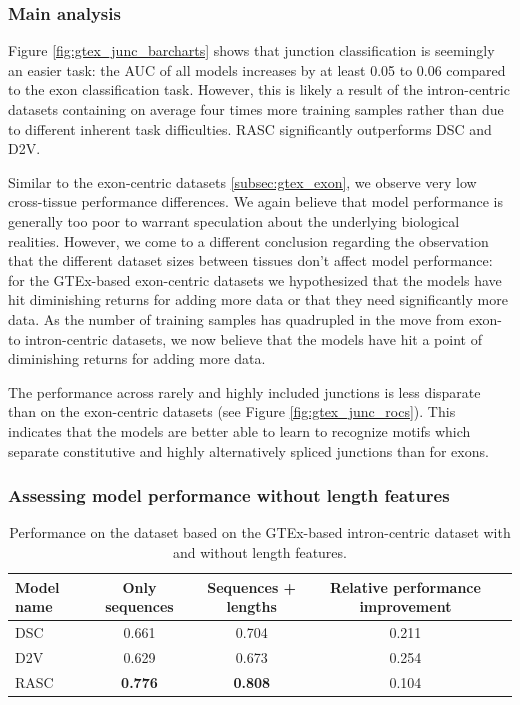 \subsubsection{Main analysis}
Figure \ref{fig:gtex_junc_barcharts} shows that junction classification is seemingly an easier task: the AUC of all models increases by at least 0.05 to 0.06 compared to the exon classification task. However, this is likely a result of the intron-centric datasets containing on average four times more training samples rather than due to different inherent task difficulties. RASC significantly outperforms DSC and D2V. 

Similar to the exon-centric datasets \ref{subsec:gtex_exon}, we observe very low cross-tissue performance differences. We again believe that model performance is generally too poor to warrant speculation about the underlying biological realities. However, we come to a different conclusion regarding the observation that the different dataset sizes between tissues don't affect model performance:
for the GTEx-based exon-centric datasets we hypothesized that the models have hit diminishing returns for adding more data or that they need significantly more data. As the number of training samples has quadrupled in the move from exon- to intron-centric datasets, we now believe that the models have hit a point of diminishing returns for adding more data. 




The performance across rarely and highly included junctions is less disparate than on the exon-centric datasets (see Figure \ref{fig:gtex_junc_rocs}). This indicates that the models are better able to learn to recognize motifs which separate constitutive and highly alternatively spliced junctions than for exons.

\subsubsection{Assessing model performance without length features}

\begin{table}[h!]
	\centering
	\begin{tabular}{| l | c | c | c| c} 
		\hline
		Model name & Only sequences & Sequences + lengths & Relative performance improvement\\
		\hline
		DSC & 0.661 & 0.704 & 0.211\\
		D2V & 0.629 & 0.673 & 0.254\\
		RASC & \textbf{0.776} & \textbf{0.808} & 0.104\\
		\hline
	\end{tabular}
	\caption{Performance on the dataset based on the GTEx-based intron-centric dataset with and without length features. 
	}
	\label{table:gtex_junc_nolens}
\end{table}

